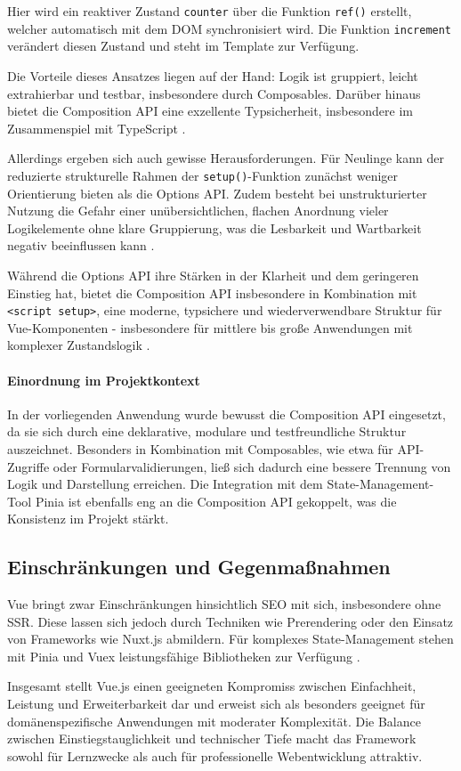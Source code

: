 Hier wird ein reaktiver Zustand \texttt{counter} über die Funktion \texttt{ref()} erstellt, welcher automatisch mit dem DOM synchronisiert wird. Die Funktion \texttt{increment} verändert diesen Zustand und steht im Template zur Verfügung.

Die Vorteile dieses Ansatzes liegen auf der Hand: Logik ist gruppiert, leicht extrahierbar und testbar, insbesondere durch Composables. Darüber hinaus bietet die Composition API eine exzellente Typsicherheit, insbesondere im Zusammenspiel mit TypeScript \cite{VueCompositionAPI2020}.

Allerdings ergeben sich auch gewisse Herausforderungen. Für Neulinge kann der reduzierte strukturelle Rahmen der \texttt{setup()}-Funktion zunächst weniger Orientierung bieten als die Options API. Zudem besteht bei unstrukturierter Nutzung die Gefahr einer unübersichtlichen, flachen Anordnung vieler Logikelemente ohne klare Gruppierung, was die Lesbarkeit und Wartbarkeit negativ beeinflussen kann \cite{CompositionAPIFAQ}.

Während die Options API ihre Stärken in der Klarheit und dem geringeren Einstieg hat, bietet die Composition API insbesondere in Kombination mit \texttt{<script setup>}, eine moderne, typsichere und wiederverwendbare Struktur für Vue-Komponenten - insbesondere für mittlere bis große Anwendungen mit komplexer Zustandslogik \cite{CompositionAPIFAQ}.

\paragraph{Einordnung im Projektkontext}
In der vorliegenden Anwendung wurde bewusst die Composition API eingesetzt, da sie sich durch eine deklarative, modulare und testfreundliche Struktur auszeichnet. Besonders in Kombination mit Composables, wie etwa für API-Zugriffe oder Formularvalidierungen, ließ sich dadurch eine bessere Trennung von Logik und Darstellung erreichen. Die Integration mit dem State-Management-Tool Pinia ist ebenfalls eng an die Composition API gekoppelt, was die Konsistenz im Projekt stärkt.


\subsection{Einschränkungen und Gegenmaßnahmen}
Vue bringt zwar Einschränkungen hinsichtlich \ac{SEO} mit sich, insbesondere ohne \ac{SSR}. Diese lassen sich jedoch durch Techniken wie Prerendering oder den Einsatz von Frameworks wie Nuxt.js abmildern. Für komplexes State-Management stehen mit Pinia und Vuex leistungsfähige Bibliotheken zur Verfügung \cite{VueMastery2023}.

\bigskip
Insgesamt stellt Vue.js einen geeigneten Kompromiss zwischen Einfachheit, Leistung und Erweiterbarkeit dar und erweist sich als besonders geeignet für domänenspezifische Anwendungen mit moderater Komplexität. Die Balance zwischen Einstiegstauglichkeit und technischer Tiefe macht das Framework sowohl für Lernzwecke als auch für professionelle Webentwicklung attraktiv.

